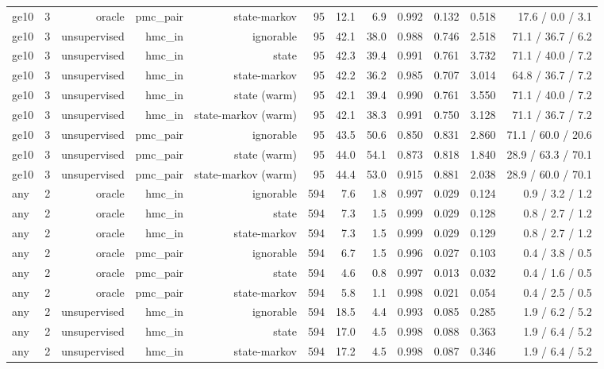 \begin{table}[ht]
\begin{tabular}{llrrrrrrrrrr}
ge10 & 3 & oracle & pmc\_pair & state-markov & 95 & 12.1 & 6.9 & 0.992 & 0.132 & 0.518 & 17.6 / 0.0 / 3.1 \\
ge10 & 3 & unsupervised & hmc\_in & ignorable & 95 & 42.1 & 38.0 & 0.988 & 0.746 & 2.518 & 71.1 / 36.7 / 6.2 \\
ge10 & 3 & unsupervised & hmc\_in & state & 95 & 42.3 & 39.4 & 0.991 & 0.761 & 3.732 & 71.1 / 40.0 / 7.2 \\
ge10 & 3 & unsupervised & hmc\_in & state-markov & 95 & 42.2 & 36.2 & 0.985 & 0.707 & 3.014 & 64.8 / 36.7 / 7.2 \\
ge10 & 3 & unsupervised & hmc\_in & state (warm) & 95 & 42.1 & 39.4 & 0.990 & 0.761 & 3.550 & 71.1 / 40.0 / 7.2 \\
ge10 & 3 & unsupervised & hmc\_in & state-markov (warm) & 95 & 42.1 & 38.3 & 0.991 & 0.750 & 3.128 & 71.1 / 36.7 / 7.2 \\
ge10 & 3 & unsupervised & pmc\_pair & ignorable & 95 & 43.5 & 50.6 & 0.850 & 0.831 & 2.860 & 71.1 / 60.0 / 20.6 \\
ge10 & 3 & unsupervised & pmc\_pair & state (warm) & 95 & 44.0 & 54.1 & 0.873 & 0.818 & 1.840 & 28.9 / 63.3 / 70.1 \\
ge10 & 3 & unsupervised & pmc\_pair & state-markov (warm) & 95 & 44.4 & 53.0 & 0.915 & 0.881 & 2.038 & 28.9 / 60.0 / 70.1 \\
any & 2 & oracle & hmc\_in & ignorable & 594 & 7.6 & 1.8 & 0.997 & 0.029 & 0.124 & 0.9 / 3.2 / 1.2 \\
any & 2 & oracle & hmc\_in & state & 594 & 7.3 & 1.5 & 0.999 & 0.029 & 0.128 & 0.8 / 2.7 / 1.2 \\
any & 2 & oracle & hmc\_in & state-markov & 594 & 7.3 & 1.5 & 0.999 & 0.029 & 0.129 & 0.8 / 2.7 / 1.2 \\
any & 2 & oracle & pmc\_pair & ignorable & 594 & 6.7 & 1.5 & 0.996 & 0.027 & 0.103 & 0.4 / 3.8 / 0.5 \\
any & 2 & oracle & pmc\_pair & state & 594 & 4.6 & 0.8 & 0.997 & 0.013 & 0.032 & 0.4 / 1.6 / 0.5 \\
any & 2 & oracle & pmc\_pair & state-markov & 594 & 5.8 & 1.1 & 0.998 & 0.021 & 0.054 & 0.4 / 2.5 / 0.5 \\
any & 2 & unsupervised & hmc\_in & ignorable & 594 & 18.5 & 4.4 & 0.993 & 0.085 & 0.285 & 1.9 / 6.2 / 5.2 \\
any & 2 & unsupervised & hmc\_in & state & 594 & 17.0 & 4.5 & 0.998 & 0.088 & 0.363 & 1.9 / 6.4 / 5.2 \\
any & 2 & unsupervised & hmc\_in & state-markov & 594 & 17.2 & 4.5 & 0.998 & 0.087 & 0.346 & 1.9 / 6.4 / 5.2 \\

\end{tabular}
\end{table}
